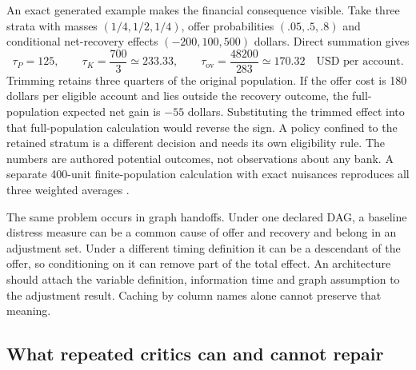 An exact generated example makes the financial consequence visible. Take
three strata with masses $(1/4,1/2,1/4)$, offer probabilities
$(.05,.5,.8)$ and conditional net-recovery effects $(-200,100,500)$ dollars.
Direct summation gives
\begin{equation}
 \tau_P=125,\qquad
 \tau_K=\frac{700}{3}\simeq233.33,\qquad
 \tau_{\mathrm{ov}}=\frac{48200}{283}\simeq170.32
 \quad\text{USD per account}.
 \label{exec13:architecture-target-numbers}
\end{equation}
Trimming retains three quarters of the original population. If the offer
cost is 180 dollars per eligible account and lies outside the recovery
outcome, the full-population expected net gain is $-55$ dollars. Substituting
the trimmed effect into that full-population calculation would reverse the
sign. A policy confined to the retained stratum is a different decision and
needs its own eligibility rule. The numbers are authored potential outcomes,
not observations about any bank. A separate 400-unit finite-population
calculation with exact nuisances reproduces all three weighted averages
\citep{exec13_architecture_exact}.

The same problem occurs in graph handoffs. Under one declared DAG, a baseline
distress measure can be a common cause of offer and recovery and belong in an
adjustment set. Under a different timing definition it can be a descendant of
the offer, so conditioning on it can remove part of the total effect. An
architecture should attach the variable definition, information time and graph
assumption to the adjustment result. Caching by column names alone cannot
preserve that meaning.

\subsection{What repeated critics can and cannot repair}

